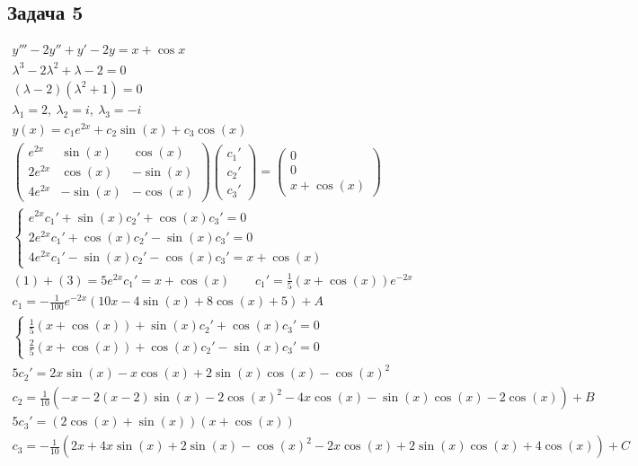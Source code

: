 	
\subsection*{Задача 5}
	\begin{gather*}
	y''' - 2y'' + y' - 2y = x + \cos x\\
	\lambda^3 - 2\lambda^2 + \lambda - 2 = 0\\
	(\lambda - 2)(\lambda^2 + 1) = 0\\
	\lambda_1 = 2,\ \lambda_2 = i,\ \lambda_3 = -i\\
	y(x) = c_1 e^{2x} + c_2 \sin(x) + c_3 \cos(x)\\
	\begin{pmatrix}
		e^{2x} & \sin(x) & \cos(x)\\
		2e^{2x} & \cos(x) & -\sin(x)\\
		4e^{2x} & -\sin(x) & -\cos(x)
	\end{pmatrix}
	\begin{pmatrix}
		c_1' \\ c_2' \\ c_3'
	\end{pmatrix}
	=
	\begin{pmatrix}
		0 \\ 0 \\ x + \cos(x)
	\end{pmatrix}\\
	\begin{cases}
		e^{2x}c_1' + \sin(x)c_2' + \cos(x)c_3' = 0\\
		2e^{2x}c_1' + \cos(x)c_2' - \sin(x)c_3' = 0\\
		4e^{2x}c_1' - \sin(x)c_2' - \cos(x)c_3' = x + \cos(x)
	\end{cases}\\
	(1) + (3) = 5e^{2x}c_1' = x + \cos(x)\qquad c_1'= \frac{1}{5}(x + \cos(x))e^{-2x}\\
	c_1 = -\frac{1}{100} e^{-2x} (10x-4\sin(x) + 8\cos(x) + 5) + A\\
	\begin{cases}
		\frac{1}{5}(x + \cos(x)) + \sin(x)c_2' + \cos(x)c_3' = 0\\
		\frac{2}{5}(x + \cos(x)) + \cos(x)c_2' - \sin(x)c_3' = 0
	\end{cases}\\	
	5c_2' = 2x \sin(x) - x \cos(x) + 2\sin(x)\cos(x) - \cos(x)^2\\
	c_2 = \frac{1}{10}(-x - 2(x-2)\sin(x) - 2 \cos(x)^2 - 4x\cos(x) - \sin(x)\cos(x) - 2\cos(x)) + B\\
	5c_3'= (2\cos(x) + \sin(x))(x + \cos(x))\\
	c_3 = -\frac{1}{10}(2x + 4x\sin(x) + 2\sin(x) - \cos(x)^2 - 2x\cos(x) + 2\sin(x)\cos(x) + 4\cos(x)) + C
	\end{gather*}
